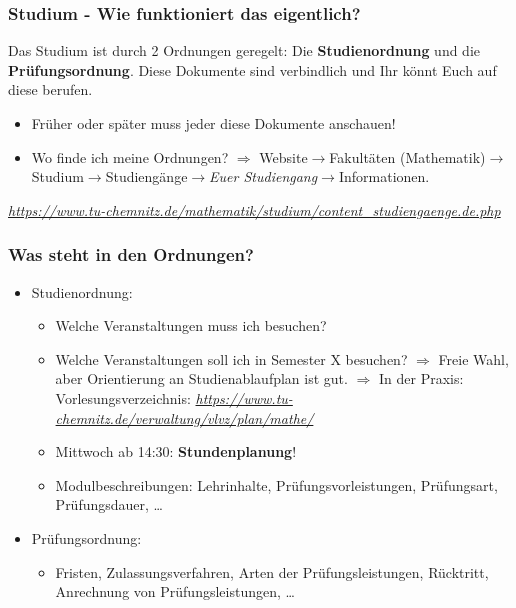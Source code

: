 \documentclass[10pt]{beamer}
\makeatletter
\newcommand{\highl}[1]{\color{tuccolor@ma}#1\color{black}}
\makeatother
\begin{document}
\begin{frame}
	\frametitle{Studium - Wie funktioniert das eigentlich?}

	\begin{block}{\vphantom{X}}
		Das Studium ist durch 2 Ordnungen geregelt: Die \textbf{Studienordnung} und die \textbf{Prüfungsordnung}. Diese Dokumente sind verbindlich und Ihr könnt Euch auf diese berufen.
	\end{block}

	\begin{itemize}
		\item Früher oder später muss jeder diese Dokumente anschauen!
		\item Wo finde ich meine Ordnungen? $\Rightarrow$ Website$\rightarrow$Fakultäten (Mathematik)$\rightarrow$Studium$\rightarrow$Studiengänge$\rightarrow$\textit{Euer Studiengang}$\rightarrow$Informationen.
	\end{itemize}

	\vspace*{1.0cm}

	\highl{\textit{\href{https://www.tu-chemnitz.de/mathematik/studium/content_studiengaenge.de.php}{https://www.tu-chemnitz.de/mathematik/studium/content\_studiengaenge.de.php}}}
\end{frame}

\begin{frame}
	\frametitle{Was steht in den Ordnungen?}

	\begin{itemize}
		\item Studienordnung:
			\begin{itemize}
				\item Welche Veranstaltungen muss ich besuchen?
				\item Welche Veranstaltungen soll ich in Semester X besuchen? $\Rightarrow$ Freie Wahl, aber Orientierung an Studienablaufplan ist gut. $\Rightarrow$ In der Praxis: Vorlesungsverzeichnis: \highl{\textit{\href{https://www.tu-chemnitz.de/verwaltung/vlvz/plan/mathe/}{https://www.tu-chemnitz.de/verwaltung/vlvz/plan/mathe/}}}
				\item Mittwoch ab 14:30: \textbf{Stundenplanung}!
				\item Modulbeschreibungen: Lehrinhalte, Prüfungsvorleistungen, Prüfungsart, Prüfungsdauer, \ldots
			\end{itemize}
		\item Prüfungsordnung:
			\begin{itemize}
				\item Fristen, Zulassungsverfahren, Arten der Prüfungsleistungen, Rücktritt, Anrechnung von Prüfungsleistungen, \ldots 
			\end{itemize}
	\end{itemize}
\end{frame}
\end{document}
